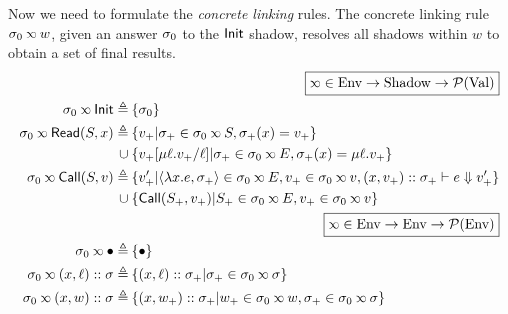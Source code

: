 Now we need to formulate the \emph{concrete linking} rules.
The concrete linking rule $\ctx_0\semlink w$, given an answer $\sigma_0$ to the $\textsf{Init}$ shadow, resolves all shadows within $w$ to obtain a set of final results.
\begin{align*}
                                                         & \pushright{\fbox{$\semlink\in\Ctx\rightarrow\Event\rightarrow\pset{\Value}$}}                                                      \\
  \ctx_0\semlink\InitE\triangleq                         & \: \{\ctx_0\}                                                                                                                      \\
  \ctx_0\semlink\ReadE(\event,x)\triangleq               & \: \{v_+|\ctx_+\in\ctx_0\semlink\event,\ctx_+(x)=v_+\}                                                                             \\
  \cup                                                   & \: \{v_+[\mu\ell.v_+/\ell]|\ctx_+\in\ctx_0\semlink E,\ctx_+(x)=\mu\ell.v_+\}                                                       \\
  \ctx_0\semlink\CallE(\event,v)\triangleq               & \: \{v_+'|\langle\lambda x.e,\ctx_+\rangle\in\ctx_0\semlink E, v_+\in\ctx_0\semlink v, (x,v_+)\cons\ctx_+\vdash e\Downarrow v_+'\} \\
  \cup                                                   & \: \{\CallE(\event_+,v_+)|\event_+\in\ctx_0\semlink E, v_+\in\ctx_0\semlink v\}                                                    \\
                                                         & \pushright{\fbox{$\semlink\in\Ctx\rightarrow\Ctx\rightarrow\pset{\Ctx}$}}                                                          \\
  \ctx_0\semlink\bullet\triangleq                        & \: \{\bullet\}                                                                                                                     \\
  \ctx_0\semlink(x,\ell)\cons\ctx\triangleq              & \: \{(x,\ell)\cons\ctx_+|\ctx_+\in\ctx_0\semlink\ctx\}                                                                             \\
  \ctx_0\semlink(x,w)\cons\ctx\triangleq                 & \: \{(x,w_+)\cons\ctx_+|w_+\in\ctx_0\semlink w,\ctx_+\in\ctx_0\semlink\ctx\}                                                       \\

\end{align*}
